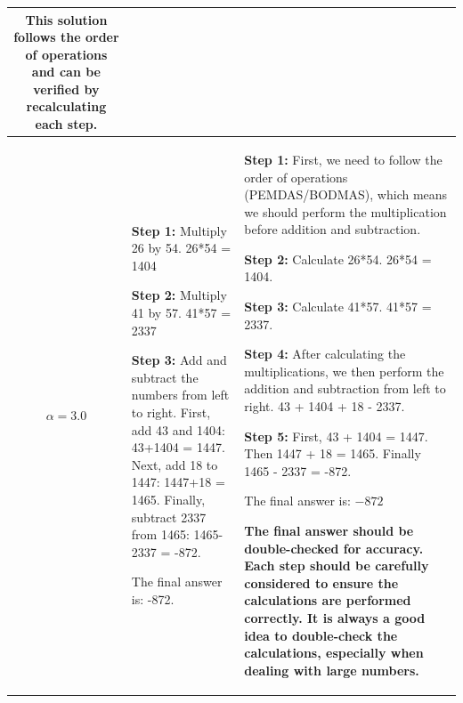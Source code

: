 \begin{table}[t]
\begin{tabularx}{\textwidth}{c|X|X}
\textbf{This solution follows the order of operations and can be verified by recalculating each step.}
\\
\hline
$\alpha = 3.0$ & 
\textbf{Step 1:} Multiply 26 by 54. 26*54 = 1404

\textbf{Step 2:} Multiply 41 by 57. 41*57 = 2337

\textbf{Step 3:} Add and subtract the numbers from left to right. First, add 43 and 1404: 43+1404 = 1447. Next, add 18 to 1447: 1447+18 = 1465. Finally, subtract 2337 from 1465: 1465-2337 = -872.

The final answer is: -872.
& 
\textbf{Step 1:} First, we need to follow the order of operations (PEMDAS/BODMAS), which means we should perform the multiplication before addition and subtraction.

\textbf{Step 2:} Calculate 26*54. 26*54 = 1404.

\textbf{Step 3:} Calculate 41*57. 41*57 = 2337.

\textbf{Step 4:} After calculating the multiplications, we then perform the addition and subtraction from left to right. 43 + 1404 + 18 - 2337.

\textbf{Step 5:} First, 43 + 1404 = 1447. Then 1447 + 18 = 1465. Finally 1465 - 2337 = -872.

The final answer is: $\boxed{-872}$

\textbf{The final answer should be double-checked for accuracy. Each step should be carefully considered to ensure the calculations are performed correctly. It is always a good idea to double-check the calculations, especially when dealing with large numbers.}
\\
\hline
\end{tabularx}
\end{table}

